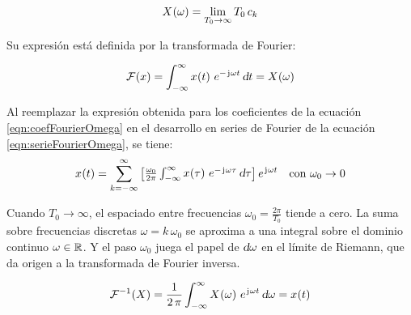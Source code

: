 \begin{mdframed}[style=DefinitionFrame]
    \begin{defn}
    \end{defn}
    \[
        \fx[X]{\omega} = \lim_{T_0 \to \infty} T_0 \, c_k
    \]
\end{mdframed}

Su expresión está definida por la transformada de Fourier:

\begin{mdframed}[style=DefinitionFrame]
    \begin{defn}
        \label{defn:FourierTrans}
    \end{defn}
    \[
        \fourier{x}
        = \int_{-\infty}^\infty \fx[x]{t} \, e^{- \iu \omega t} \, \dif t
        = \fx[X]{\omega}
    \]
\end{mdframed}

Al reemplazar la expresión obtenida para los coeficientes de la ecuación \ref{eqn:coefFourierOmega} en el desarrollo en series de Fourier de la ecuación \ref{eqn:serieFourierOmega}, se tiene:
\[
    \fx[x]{t}
    = \sum_{\kth=-\infty}^\infty
    \inBrackets{ \frac{\omega_0}{2 \pi} \int_{-\infty}^{\infty} \fx[x]{\tau} \, e^{- \iu \omega \tau} \, \dif \tau }
    \, \complexExp
    \quad \text{con } \omega_0 \to 0
\]

Cuando $T_0 \to \infty$, el espaciado entre frecuencias $\omega_0 = \frac{2\pi}{T_0}$ tiende a cero.
La suma sobre frecuencias discretas $\omega = k \, \omega_0$ se aproxima a una integral sobre el dominio continuo $\omega \in \setR$.
Y el paso $\omega_0$ juega el papel de $\dif \omega$ en el límite de Riemann, que da origen a la transformada de Fourier inversa.

\begin{mdframed}[style=DefinitionFrame]
    \begin{defn}
        \label{defn:FourierTransInv}
    \end{defn}
    \[
        \ffourier{X}
        = \frac{1}{2 \, \pi} \int_{-\infty}^\infty \fx[X]{\omega} \, \complexExp \, \dif \omega
        = \fx[x]{t}
    \]
\end{mdframed}
